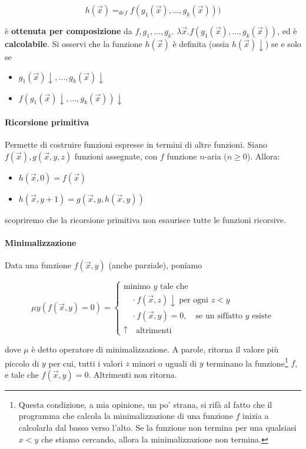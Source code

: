 	$$
	h(\vec{x})=_{def}f(g_1(\vec{x}), \dots,g_k(\vec{x})))
	$$
	
	è \textbf{ottenuta per composizione} da $f,g_1,\dots,g_k$. $\lambda\vec{x}.f(g_1(\vec{x}), \dots, g_k(\vec{x}))$, ed è \textbf{calcolabile}. 
	Si osservi che la funzione $h(\vec{x})$ è definita (ossia $h(\vec{x})\downarrow$) se e solo se
	
	\begin{itemize}
		\item $g_1(\vec{x})\downarrow, \dots, g_k(\vec{x})\downarrow$
		\item $f(g_1(\vec{x})\downarrow, \dots, g_k(\vec{x}))\downarrow$
	\end{itemize}
	
	\paragraph{Ricorsione primitiva}
	Permette di costruire funzioni espresse in termini di altre funzioni. Siano $f(\vec{x}), g(\vec{x},y,z)$ funzioni assegnate, con $f$ funzione $n$-aria ($n \geq 0$). Allora:
	\begin{itemize}
		\item 	$h(\vec{x}, 0) = f(\vec{x})$
		\item $h(\vec{x}, y+1) = g(\vec{x}, y, h(\vec{x}, y))$
	\end{itemize}
	
	scopriremo che la ricorsione primitiva non esaurisce tutte le funzioni ricorsive.
	
	\paragraph{Minimalizzazione}
	Data una funzione $f(\vec{x},y)$ (anche parziale), poniamo
	
	$$
	\mu y ( f(\vec{x},y) = 0 )
	=
	\begin{cases}
		\text{minimo } y \text{ tale che} \\[4pt]
		\quad \cdot f(\vec{x},z)\downarrow \ \text{per ogni } z <y\\[4pt]
		\quad \cdot f(\vec{x},y) = 0, 
		\quad \text{se un siffatto } y \text{ esiste} \\[8pt]
		\uparrow \quad \text{altrimenti}
	\end{cases}
	$$
	
	dove $\mu$ è detto operatore di minimalizzazione. A parole, ritorna il valore più piccolo di $y$ per cui, tutti i valori $z$ minori o uguali di $y$ terminano la funzione\footnote{Questa condizione, a mia opinione, un po' strana, si rifà al fatto che il programma che calcola la minimalizzazione di una funzione $f$ inizia a calcolarla dal basso verso l'alto. Se la funzione non termina per una qualsiasi $x <y$ che stiamo cercando, allora la minimalizzazione non termina.}  $f$, e tale che $f(\vec{x}, y) = 0$. Altrimenti non ritorna.
	